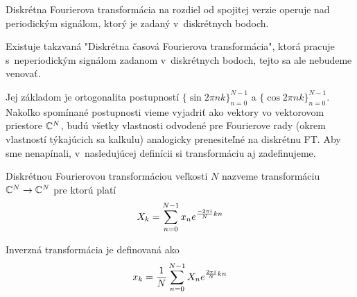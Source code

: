 Diskrétna Fourierova transformácia na rozdiel od spojitej verzie operuje nad
periodickým signálom, ktorý je zadaný v~diskrétnych bodoch.

\begin{poznamka}
    Existuje takzvaná "Diskrétna časová Fourierova transformácia",
    ktorá pracuje s~neperiodickým signálom zadanom v~diskrétnych
    bodoch, tejto sa ale nebudeme venovať.
\end{poznamka}

Jej základom je ortogonalita postupností $\{\sin 2\pi n
k\}_{n=0}^{N-1}$ a $\{\cos 2\pi n k\}_{n=0}^{N-1}$. Nakoľko spomínané
postupnosti vieme vyjadriť ako vektory vo vektorovom priestore
$\mathbb{C}^N$, budú všetky vlastnosti odvodené pre Fourierove rady (okrem
vlastností týkajúcich sa kalkulu) analogicky prenesiteľné na diskrétnu
FT. Aby sme nenapínali, v~nasledujúcej definícii si transformáciu aj
zadefinujeme.

\begin{definicia}
        Diskrétnou Fourierovou transformáciou veľkosti $N$ nazveme 
        transformáciu $\mathbb{C}^N\rightarrow\mathbb{C}^N$ pre ktorú platí
        \begin{equation*}
            X_k = \sum_{n=0}^{N-1} x_n e^{\frac{-2\pi\hat{\imath}}{N} k n}
        \end{equation*}
\end{definicia}

Inverzná transformácia je definovaná ako
\begin{equation*}
    x_k = \frac{1}{N} \sum_{n=0}^{N-1} X_n e^{\frac{2\pi\hat{\imath}}{N} kn}
\end{equation*}

